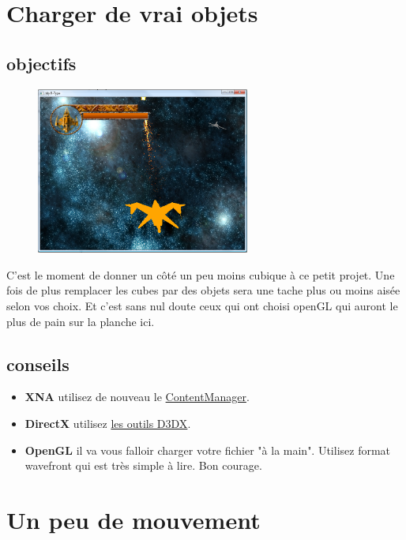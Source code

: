 \documentclass[12pt,a4paper]{report}
\begin{document}
\section{Charger de vrai objets}
\subsection{objectifs}
\begin{figure}[!h]\centering\includegraphics[width=7cm]{model_window.png}\end{figure}
C'est le moment de donner un côté un peu moins cubique à ce petit projet. Une fois de
plus remplacer les cubes par des objets sera une tache plus ou moins aisée selon vos choix. Et c'est sans nul doute
ceux qui ont choisi openGL qui auront le plus de pain sur la planche ici.
\subsection{conseils}
\begin{itemize}
\item \textbf{XNA} utilisez de nouveau le \href{http://msdn.microsoft.com/en-us/library/bb197848.aspx}{ContentManager}.
\item \textbf{DirectX} utilisez \href{http://msdn.microsoft.com/en-us/library/bb172890(v=vs.85).aspx}{les outils D3DX}.
\item \textbf{OpenGL} il va vous falloir charger votre fichier "à la main". Utilisez format wavefront qui est très simple à lire. Bon courage.
\end{itemize}

\newpage
\section{Un peu de mouvement}
\end{document}
